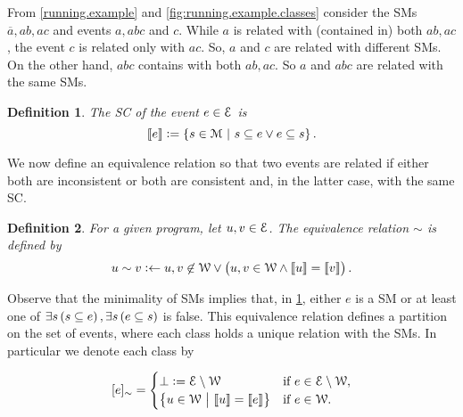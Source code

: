 \documentclass{article}
\newtheorem{definition}{Definition}
\newcommand{\co}[1]{\ensuremath{\overline{#1}}}
\newcommand{\cla}[1]{\ensuremath{{\cal #1}}}
\newcommand{\stablecore}[1]{\ensuremath{\left\llbracket #1 \right\rrbracket}}
\newcommand{\class}[1]{\ensuremath{[{#1}]_{\sim}}}
\newcommand{\inconsistent}{\bot}
\newcommand{\given}{\ensuremath{~\middle|~}}
\newcommand{\MODELset}{\ensuremath{\cla{M}}}
\newcommand{\EVENTSset}{\ensuremath{\cla{E}}}
\newcommand{\CONSISTset}{\ensuremath{\cla{W}}}
\begin{document}
From \cref{running.example} and \cref{fig:running.example.classes}
consider the \acp{SM} $\co{a}, ab, ac$ and events $a, abc$ and $c$.
While $a$ is related with (contained in) both $ab, ac$, the event $c$
is related only with $ac$.  So, $a$ and $c$ are related with different
\acp{SM}.  On the other hand, $abc$ contains with both $ab, ac$.  So
$a$ and $abc$ are related with the same \aclp{SM}.

\begin{definition}\label{def:stable.core}
	The \textit{\ac{SC}} of the event $e\in \EVENTSset$ is
	\begin{equation}
		\stablecore{e} := \set{s \in \MODELset \given s \subseteq e \vee e \subseteq s}. \label{eq:stable.core}
	\end{equation}
\end{definition}

We now define an equivalence relation so that two events are related
if either both are inconsistent or both are consistent and, in the
latter case, with the same \acl{SC}.

\begin{definition}\label{def:equiv.rel}
  For a given program, let $u, v \in \EVENTSset$.  The equivalence
  relation $\sim$ is defined by
	\begin{equation}
		u \sim v : \leftarrow u,v \not\in\CONSISTset \vee \del{u,v \in \CONSISTset \wedge \stablecore{u} = \stablecore{v}}.\label{eq:equiv.rel}
	\end{equation}
\end{definition}

Observe that the minimality of \aclp{SM} implies that, in
\cref{def:stable.core}, either $e$ is a \acl{SM} or at least one of
$\exists s \del{s \subseteq e}, \exists s \del{e \subseteq s}$ is
false.  This equivalence relation defines a partition on the set of
events, where each class holds a unique relation with the \aclp{SM}.
In particular we denote each class by

\begin{equation}
	\class{e} =
	\begin{cases}
		\inconsistent := \EVENTSset \setminus \CONSISTset
		 & \text{if~} e \in \EVENTSset \setminus \CONSISTset, \\
		\set{u \in \CONSISTset \given \stablecore{u} = \stablecore{e}}
		 & \text{if~} e \in \CONSISTset.
	\end{cases}\label{eq:event.class}
\end{equation}
\end{document}
